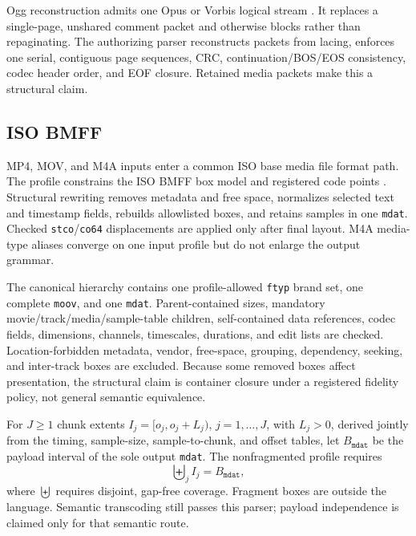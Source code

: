 Ogg reconstruction admits one Opus or Vorbis logical stream
\cite{rfc3533,vorbisI,rfc7845}. It replaces a single-page, unshared comment
packet and otherwise blocks rather than repaginating. The authorizing parser
reconstructs packets from lacing, enforces one serial, contiguous page
sequences, CRC, continuation/BOS/EOS consistency, codec header order, and EOF
closure. Retained media packets make this a structural claim.

\subsection{ISO BMFF}\label{subsec:isobmff-method}

MP4, MOV, and M4A inputs enter a common ISO base media file format path. The
profile constrains the ISO BMFF box model and registered code points
\cite{iso1449612,mp4ra}. Structural rewriting removes metadata and free space,
normalizes selected text and timestamp fields, rebuilds allowlisted boxes, and
retains samples in one \texttt{mdat}. Checked \texttt{stco}/\texttt{co64}
displacements are applied only after final layout. M4A media-type aliases
converge on one input profile but do not enlarge the output grammar.

The canonical hierarchy contains one profile-allowed \texttt{ftyp} brand set,
one complete \texttt{moov}, and one \texttt{mdat}. Parent-contained sizes,
mandatory movie/track/media/sample-table children, self-contained data
references, codec fields, dimensions, channels, timescales, durations, and edit
lists are checked. Location-forbidden metadata, vendor, free-space, grouping,
dependency, seeking, and inter-track boxes are excluded. Because some removed
boxes affect presentation, the structural claim is container closure under a
registered fidelity policy, not general semantic equivalence.

For \(J\ge1\) chunk extents \(I_j=[o_j,o_j+L_j)\), \(j=1,\ldots,J\), with
\(L_j>0\), derived jointly from the timing, sample-size, sample-to-chunk, and
offset tables, let \(B_{\mathtt{mdat}}\) be the payload interval of the sole
output \texttt{mdat}. The nonfragmented profile
requires
\begin{equation}
 \biguplus_j I_j=B_{\mathtt{mdat}},
\label{eq:isobmff-offset}
\end{equation}
where \(\biguplus\) requires disjoint, gap-free coverage. Fragment boxes are
outside the language. Semantic transcoding still passes this parser; payload
independence is claimed only for that semantic route.

